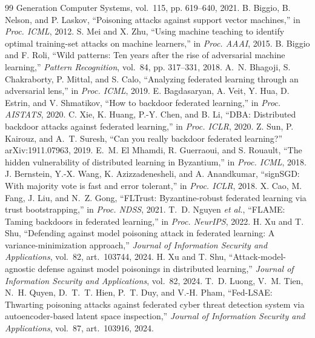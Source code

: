 \documentclass[final,1p,times]{elsarticle}
\newcommand{\etal}{\emph{et al.}}
\begin{document}
\begin{thebibliography}{99}
{Generation Computer Systems}, vol.~115, pp. 619--640, 2021.
B. Biggio, B. Nelson, and P. Laskov, ``Poisoning attacks against
support vector machines,'' in \emph{Proc. ICML}, 2012.
S. Mei and X. Zhu, ``Using machine teaching to identify optimal
training-set attacks on machine learners,'' in \emph{Proc. AAAI}, 2015.
B. Biggio and F. Roli, ``Wild patterns: Ten years after the rise of
adversarial machine learning,'' \emph{Pattern Recognition}, vol.~84,
pp. 317--331, 2018.
A.~N. Bhagoji, S. Chakraborty, P. Mittal, and S. Calo, ``Analyzing
federated learning through an adversarial lens,'' in \emph{Proc. ICML},
2019.
E. Bagdasaryan, A. Veit, Y. Hua, D. Estrin, and V. Shmatikov, ``How to
backdoor federated learning,'' in \emph{Proc. AISTATS}, 2020.
C. Xie, K. Huang, P.-Y. Chen, and B. Li, ``DBA: Distributed backdoor
attacks against federated learning,'' in \emph{Proc. ICLR}, 2020.
Z. Sun, P. Kairouz, and A.~T. Suresh, ``Can you really backdoor
federated learning?'' arXiv:1911.07963, 2019.
E.~M. El Mhamdi, R. Guerraoui, and S. Rouault, ``The hidden
vulnerability of distributed learning in Byzantium,'' in
\emph{Proc. ICML}, 2018.
J. Bernstein, Y.-X. Wang, K. Azizzadenesheli, and A. Anandkumar,
``signSGD: With majority vote is fast and error tolerant,'' in
\emph{Proc. ICLR}, 2018.
X. Cao, M. Fang, J. Liu, and N.~Z. Gong, ``FLTrust: Byzantine-robust
federated learning via trust bootstrapping,'' in \emph{Proc. NDSS},
2021.
T.~D. Nguyen \etal, ``FLAME: Taming backdoors in federated learning,''
in \emph{Proc. NeurIPS}, 2022.
H. Xu and T. Shu, ``Defending against model poisoning attack in
federated learning: A variance-minimization approach,'' \emph{Journal
of Information Security and Applications}, vol.~82, art.~103744, 2024.
H. Xu and T. Shu, ``Attack-model-agnostic defense against model
poisonings in distributed learning,'' \emph{Journal of Information
Security and Applications}, vol.~82, 2024.
T.~D. Luong, V.~M. Tien, N.~H. Quyen, D.~T.~T. Hien, P.~T. Duy, and
V.-H. Pham, ``Fed-LSAE: Thwarting poisoning attacks against federated
cyber threat detection system via autoencoder-based latent space
inspection,'' \emph{Journal of Information Security and Applications},
vol.~87, art.~103916, 2024.

\end{thebibliography}
\end{document}
